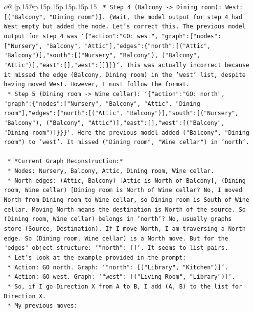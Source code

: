 \documentclass{article}
\begin{document}
{\begin{supertabular}{c@{$\;$}|p{.15\linewidth}@{}p{.15\linewidth}p{.15\linewidth}p{.15\linewidth}p{.15\linewidth}p{.15\linewidth}}
{{{\texttt{            *   Step 4 (Balcony {-}> Dining room): West: {[}("Balcony", "Dining room"){]}. (Wait, the model output for step 4 had West empty but added the node. Let's correct this. The previous model output for step 4 was `\{"action":"GO: west", "graph":\{"nodes":{[}"Nursery", "Balcony", "Attic"{]},"edges":\{"north":{[}("Attic", "Balcony"){]},"south":{[}("Nursery", "Balcony"), ("Balcony", "Attic"){]},"east":{[}{]},"west":{[}{]}\}\}\}`. This was actually incorrect because it missed the edge (Balcony, Dining room) in the 'west' list, despite having moved West. However, I must follow the format.} \\
\texttt{            *   Step 5 (Dining room {-}> Wine cellar): `\{"action":"GO: north", "graph":\{"nodes":{[}"Nursery", "Balcony", "Attic", "Dining room"{]},"edges":\{"north":{[}("Attic", "Balcony"){]},"south":{[}("Nursery", "Balcony"), ("Balcony", "Attic"){]},"east":{[}{]},"west":{[}("Balcony", "Dining room"){]}\}\}\}`. Here the previous model added ("Balcony", "Dining room") to 'west'. It missed ("Dining room", "Wine cellar") in 'north'.} \\
\\ 
\texttt{    *   *Current Graph Reconstruction:*} \\
\texttt{        *   Nodes: Nursery, Balcony, Attic, Dining room, Wine cellar.} \\
\texttt{        *   North edges: (Attic, Balcony) {[}Attic is North of Balcony{]}, (Dining room, Wine cellar) {[}Dining room is North of Wine cellar? No, I moved North from Dining room to Wine cellar, so Dining room is South of Wine cellar. Moving North means the destination is North of the source. So (Dining room, Wine cellar) belongs in 'north'? No, usually graphs store (Source, Destination). If I move North, I am traversing a North edge. So (Dining room, Wine cellar) is a North move. But for the "edges" object structure: `"north": {[}{]}`. It seems to list pairs.} \\
\texttt{        *   Let's look at the example provided in the prompt:} \\
\texttt{            *   Action: GO north. Graph: `"north": {[}("Library", "Kitchen"){]}`.} \\
\texttt{            *   Action: GO west. Graph: `"west": {[}("Living Room", "Library"){]}`.} \\
\texttt{        *   So, if I go Direction X from A to B, I add (A, B) to the list for Direction X.} \\
\texttt{        *   My previous moves:} \\
}}}
\end{supertabular}}
\end{document}

